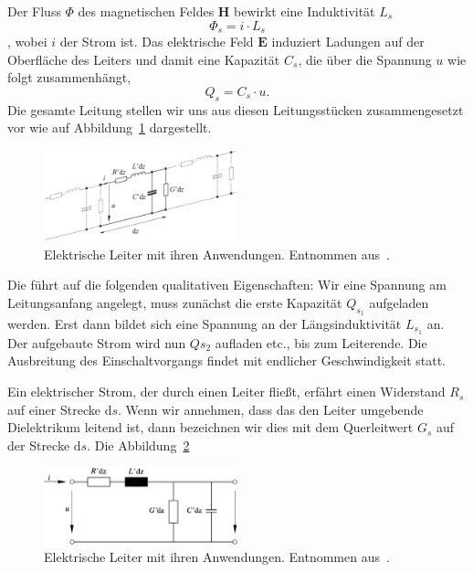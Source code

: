 \documentclass[paper=a4, parskip=half-, ngerman, fontsize=11pt]{scrreprt}
\begin{document}
Der Fluss $\Phi$ des magnetischen Feldes $\textbf{H}$ bewirkt eine Induktivität $L_{s}$
\[ \Phi_{s} = i \cdot L_{s} \], wobei $i$ der Strom ist.
Das elektrische Feld $\textbf{E}$ induziert Ladungen auf der Oberfläche des Leiters und damit eine Kapazität $C_{s}$,
die über die Spannung $u$ wie folgt zusammenhängt,
\[ Q_{s} = C_{s} \cdot u . \]
Die gesamte Leitung stellen wir uns aus diesen Leitungsstücken zusammengesetzt vor wie auf Abbildung~\ref{Leitung2}
dargestellt.
\begin{figure}[!h]
    \begin{center}
        \includegraphics[width=0.5\textwidth]{images/Leitung2.png}
        \caption{Elektrische Leiter mit ihren Anwendungen. Entnommen aus~\cite{LeitungenUndFilter}.}
        \label{Leitung2}
    \end{center}
\end{figure}
Die führt auf die folgenden qualitativen Eigenschaften: Wir eine Spannung am Leitungsanfang angelegt, muss zunächst die
erste Kapazität $Q_{s_{1}}$ aufgeladen werden. Erst dann bildet sich eine Spannung an der Längsinduktivität $L_{s_{1}}$
an. Der aufgebaute Strom wird nun $Q{s_{2}}$ aufladen etc., bis zum Leiterende. Die Ausbreitung des Einschaltvorgangs
findet mit endlicher Geschwindigkeit statt.

Ein elektrischer Strom, der durch einen Leiter fließt, erfährt einen Widerstand $R_{s}$ auf einer Strecke
$\mathrm{d}s$. Wenn wir annehmen, dass das den Leiter umgebende Dielektrikum leitend ist, dann bezeichnen wir dies mit
dem Querleitwert
$G_{s}$ auf der Strecke $\mathrm{d}s$. Die Abbildung~\ref{Leitung3}
\begin{figure}[!h]
    \begin{center}
        \includegraphics[width=0.5\textwidth]{images/Leitungsstueck.png}
        \caption{Elektrische Leiter mit ihren Anwendungen. Entnommen aus~\cite{LeitungenUndFilter}.}
        \label{Leitung3}
    \end{center}
\end{figure}
\end{document}
